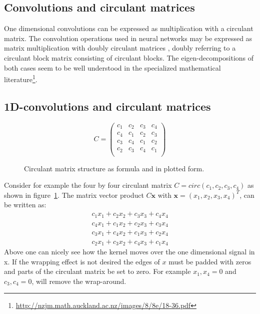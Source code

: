 \documentclass{article}
\begin{document}
\subsection{Convolutions and circulant matrices}
One dimensional convolutions can be expressed as multiplication with a circulant matrix.
The convolution operations used in neural networks may be expressed as matrix multiplication
with doubly circulant matrices \cite[page 324]{goodfellow}, doubly referring to a circulant block matrix consisting of circulant blocks. 
The eigen-decompositions of both cases seem to be well understood in the specialized mathematical literature\footnote{\url{http://nzjm.math.auckland.ac.nz/images/8/8e/18-36.pdf}}.

\subsection{1D-convolutions and circulant matrices}
\begin{figure}
\centering
\begin{minipage}{.45\textwidth}
\begin{equation*}
C = \begin{pmatrix}
c_1 & c_2 & c_3 & c_4 \\
c_4 & c_1 & c_2 & c_3 \\
c_3 & c_4 & c_1 & c_2 \\
c_2 & c_3 & c_4 & c_1 \\
\end{pmatrix}
\end{equation*}
\end{minipage}
\begin{minipage}{.45\textwidth}
\scalebox{0.4}{}
\end{minipage}
\caption{Circulant matrix structure as formula and in plotted form.}
\label{fig:circ1}
\end{figure}
Consider for example the four by four circulant matrix $C = circ(c_1,c_2,c_3,c_4)$
as shown in figure~\ref{fig:circ1}.
The matrix vector product $C\mathbf{x}$ with $\mathbf{x} = (x_1, x_2, x_3, x_4)^T$, can be written as:
\begin{align}
c_1x_1 + c_2x_2 + c_3x_3 + c_4x_4 \\
c_4x_1 + c_1x_2 + c_2x_3 + c_3x_4 \\
c_3x_1 + c_4x_2 + c_1x_3 + c_2x_4 \\
c_2x_1 + c_3x_2 + c_4x_3 + c_1x_4
\end{align}
Above one can nicely see how the kernel moves over the one dimensional signal in x. If the wrapping effect is not desired the edges of $x$ must be padded with zeros and parts of the circulant matrix be set to zero. For example $x_1, x_4 =0$ and $c_3,c_4=0$, will remove the wrap-around.
\end{document}
